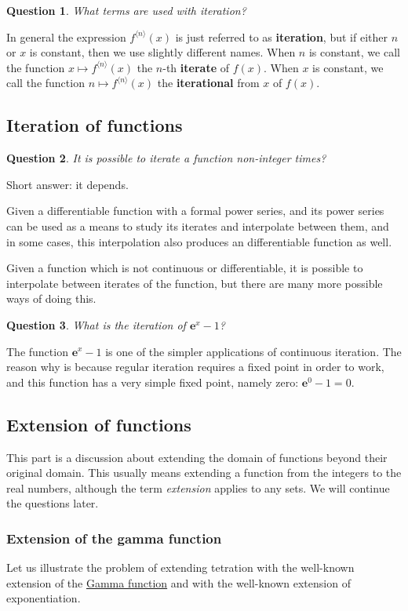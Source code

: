 \documentclass[12pt]{article}
\newtheorem{question}{Question}
\theoremstyle{definition}
\newcommand{\ee}{{\boldsymbol{e}}}
\newcommand{\iter}[2]{{#1}^{\langle{#2}\rangle}}
\begin{document}
\begin{question}
What terms are used with iteration?
\end{question}
In general the expression $\iter{f}n(x)$ is just referred to as {\bf iteration}, but if either $n$ or $x$ is constant, then we use slightly different names. When $n$ is constant, we call the function $x \mapsto \iter{f}n(x)$ the $n$-th {\bf iterate} of $f(x)$. When $x$ is constant, we call the function $n \mapsto \iter{f}n(x)$ the {\bf iterational} from $x$ of $f(x)$.

\subsection{Iteration of functions}
\begin{question}
It is possible to iterate a function non-integer times?
\end{question}
Short answer: it depends. 

Given a differentiable function with a formal power series, and its power series can be used as a means to study its iterates and interpolate between them, and in some cases, this interpolation also produces an differentiable function as well.

Given a function which is not continuous or differentiable, it is possible to interpolate between iterates of the function, but there are many more possible ways of doing this.

\begin{question}
What is the iteration of $\ee^x - 1$?
\end{question}
The function $\ee^x - 1$ is one of the simpler applications of continuous iteration. The reason why is because regular iteration requires a fixed point in order to work, and this function has a very simple fixed point, namely zero: $\ee^0 - 1 = 0$.


\subsection{Extension of functions}

This part is a discussion about extending the domain of functions beyond their original domain. This usually means extending a function from the integers to the real numbers, although the term {\it extension} applies to any sets. We will continue the questions later.

\subsubsection{Extension of the gamma function}
Let us illustrate the problem of extending tetration with the well-known extension of the
\href{http://en.wikipedia.org/wiki/Gamma_function}{Gamma function} and
with the well-known extension of exponentiation.
\end{document}
